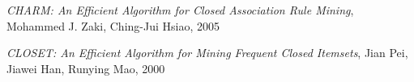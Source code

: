 
\begin{thebibliography}{99}

 \emph{CHARM: An Efficient Algorithm for Closed Association Rule Mining}, Mohammed J. Zaki, Ching-Jui Hsiao, 2005

 \emph{CLOSET: An Efficient Algorithm for Mining Frequent Closed Itemsets}, Jian Pei, Jiawei Han, Runying Mao, 2000


\end{thebibliography}
